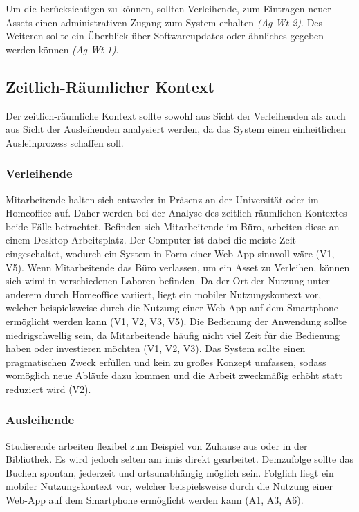 Um die  berücksichtigen zu können, sollten Verleihende,
zum Eintragen neuer Assets einen administrativen Zugang zum System erhalten
\textit{(Ag-Wt-2)}. Des Weiteren sollte ein Überblick über Softwareupdates oder
ähnliches gegeben werden können \textit{(Ag-Wt-1)}.


\subsection{Zeitlich-Räumlicher Kontext}
\label{section:zeit}
Der zeitlich-räumliche Kontext sollte sowohl aus Sicht der Verleihenden als auch
aus Sicht der Ausleihenden analysiert werden, da das System einen einheitlichen
Ausleihprozess schaffen soll.

\subsubsection{Verleihende}
Mitarbeitende halten sich entweder in Präsenz an der Universität oder im
Homeoffice auf. Daher werden bei der Analyse des zeitlich-räumlichen Kontextes
beide Fälle betrachtet. Befinden sich Mitarbeitende im Büro, arbeiten diese an
einem Desktop-Arbeitsplatz. Der Computer ist dabei die meiste Zeit
eingeschaltet, wodurch ein System in Form einer Web-App sinnvoll wäre (V1, V5).
Wenn Mitarbeitende das Büro verlassen, um ein Asset zu Verleihen, können sich
\ac{wimi} in verschiedenen Laboren befinden. Da der Ort der Nutzung unter
anderem durch Homeoffice variiert, liegt ein mobiler Nutzungskontext vor,
welcher beispielsweise durch die Nutzung einer Web-App auf dem Smartphone
ermöglicht werden kann (V1, V2, V3, V5). Die Bedienung der Anwendung sollte
niedrigschwellig sein, da Mitarbeitende häufig nicht viel Zeit für die Bedienung
haben oder investieren möchten (V1, V2, V3). Das System sollte einen
pragmatischen Zweck erfüllen und kein zu großes Konzept umfassen, sodass
womöglich neue Abläufe dazu kommen und die Arbeit zweckmäßig erhöht statt
reduziert wird (V2).

\subsubsection{Ausleihende}
Studierende arbeiten flexibel zum Beispiel von Zuhause aus oder in der
Bibliothek. Es wird jedoch selten am \ac{imis} direkt gearbeitet. Demzufolge
sollte das Buchen spontan, jederzeit und ortsunabhängig möglich sein. Folglich
liegt ein mobiler Nutzungskontext vor, welcher beispielsweise durch die Nutzung
einer Web-App auf dem Smartphone ermöglicht werden kann (A1, A3, A6).


